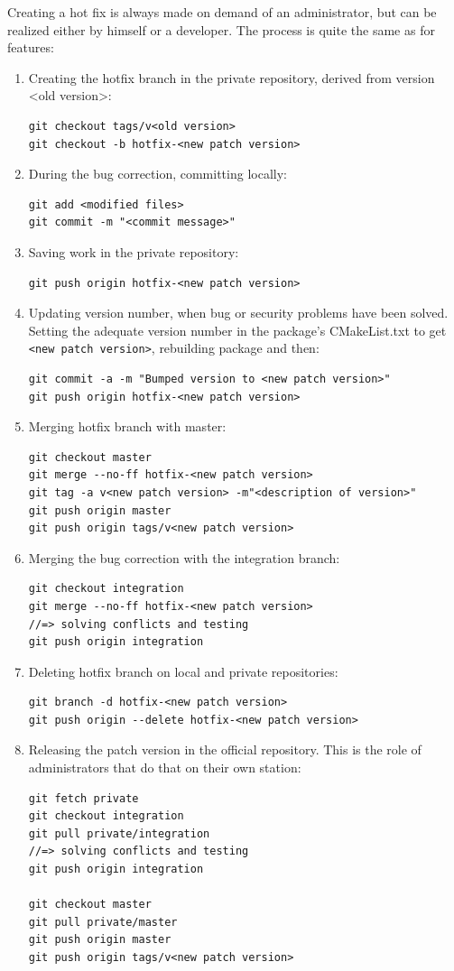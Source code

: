 \documentclass[12pt,a4paper]{article}
\begin{document}
Creating a hot fix is always made on demand of an administrator, but can be realized either by himself or a developer. The process is quite the same as for features: 
\begin{enumerate}
\item Creating the hotfix branch in the private repository, derived from version <old version>:
\begin{verbatim}
git checkout tags/v<old version>
git checkout -b hotfix-<new patch version>
\end{verbatim}
\item During the bug correction, committing locally:
\begin{verbatim}
git add <modified files>
git commit -m "<commit message>"
\end{verbatim}
\item Saving work in the private repository:
\begin{verbatim}
git push origin hotfix-<new patch version>
\end{verbatim}
\item Updating version number, when bug or security problems have been solved. Setting the adequate version number in the package's CMakeList.txt to get \texttt{<new patch version>}, rebuilding package and then:
\begin{verbatim}
git commit -a -m "Bumped version to <new patch version>"
git push origin hotfix-<new patch version>
\end{verbatim}
\item Merging hotfix branch with master:
\begin{verbatim}
git checkout master
git merge --no-ff hotfix-<new patch version>
git tag -a v<new patch version> -m"<description of version>"
git push origin master
git push origin tags/v<new patch version>
\end{verbatim}
\item Merging the bug correction with the integration branch:
\begin{verbatim}
git checkout integration
git merge --no-ff hotfix-<new patch version>
//=> solving conflicts and testing
git push origin integration
\end{verbatim}
\item Deleting hotfix branch on local and private repositories:
\begin{verbatim}
git branch -d hotfix-<new patch version>
git push origin --delete hotfix-<new patch version>
\end{verbatim}
\item Releasing the patch version in the official repository. This is the role of administrators that do that on their own station:
\begin{verbatim}
git fetch private
git checkout integration
git pull private/integration
//=> solving conflicts and testing
git push origin integration

git checkout master
git pull private/master
git push origin master
git push origin tags/v<new patch version>
\end{verbatim}
\end{enumerate}
\end{document}
